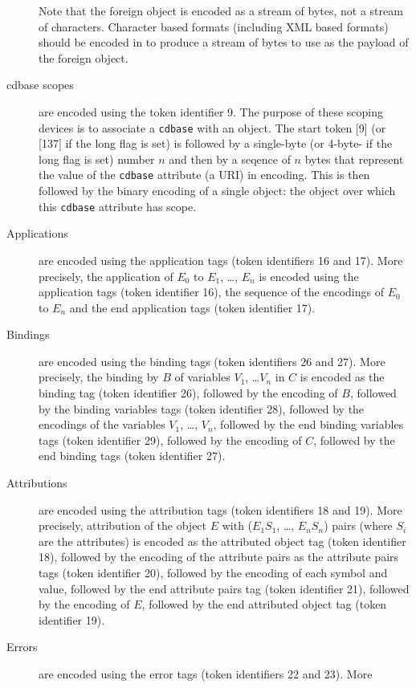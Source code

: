 \begin{description}
    Note that the foreign object is encoded as a stream of bytes, not a stream of
    characters. Character based formats (including XML based formats) should be encoded in
     to produce a stream of bytes to use as the payload of the foreign
    object.
  \item[cdbase scopes] are encoded using the token identifier 9. The purpose of these
    scoping devices is to associate a \lstinline|cdbase| with an object. The start token
    [9] (or [137] if the long flag is set) is followed by a single-byte (or 4-byte- if the
    long flag is set) number $n$ and then by a seqence of $n$ bytes that represent the
    value of the \lstinline|cdbase| attribute (a URI) in  encoding. This
    is then followed by the binary encoding of a single object: the object over which this
    \lstinline|cdbase| attribute has scope.
  \item[Applications] are encoded using the application tags (token identifiers 16 and
    17). More precisely, the application of $E_0$ to $E_1$, \ldots, $E_n$ is encoded using
    the application tags (token identifier 16), the sequence of the encodings of $E_0$ to
    $E_n$ and the end application tags (token identifier 17).
  \item[Bindings] are encoded using the binding tags (token identifiers 26 and 27). More
    precisely, the binding by $B$ of variables $V_1$, \ldots $V_n$ in $C$ is encoded as
    the binding tag (token identifier 26), followed by the encoding of $B$, followed by
    the binding variables tags (token identifier 28), followed by the encodings of the
    variables $V_1$, \ldots, $V_n$, followed by the end binding variables tags (token
    identifier 29), followed by the encoding of $C$, followed by the end binding tags
    (token identifier 27).
  \item[Attributions] are encoded using the attribution tags (token identifiers 18 and
    19). More precisely, attribution of the object $E$ with ($E_1 S_1$, \ldots, $E_n S_n$)
    pairs (where $S_i$ are the attributes) is encoded as the attributed object tag (token
    identifier 18), followed by the encoding of the attribute pairs as the attribute pairs
    tags (token identifier 20), followed by the encoding of each symbol and value,
    followed by the end attribute pairs tag (token identifier 21), followed by the
    encoding of $E$, followed by the end attributed object tag (token identifier 19).
  \item[Errors] are encoded using the error tags (token identifiers 22 and 23). More

\end{description}
